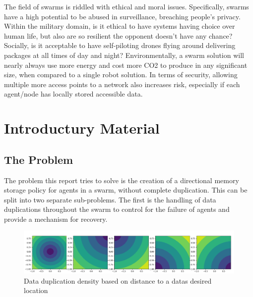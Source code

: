 \documentclass{UoYCSproject}
\begin{document}
\begin{summary}

The field of swarms is riddled with ethical and moral issues. Specifically, swarms have a high potential to be abused in surveillance, breaching people's privacy. Within the military domain, is it ethical to have systems having choice over human life, but also are so resilient the opponent doesn’t have any chance? Socially, is it acceptable to have self-piloting drones flying around delivering packages at all times of day and night? Environmentally, a swarm solution will nearly always use more energy and cost more CO2 to produce in any significant size, when compared to a single robot solution. In terms of security, allowing multiple more access points to a network also increases risk, especially if each agent/node has locally stored accessible data.

\end{summary}




\chapter{Introductury Material}
\label{cha:Introductury Material}

\section{The Problem}
\label{sec:Problem}

The problem this report tries to solve is the creation of a directional memory storage policy for agents in a swarm, without complete duplication.
This can be split into two separate sub-problems.
The first is the handling of data duplications throughout the swarm to control for the failure of agents and provide a mechanism for recovery.

\begin{figure}[htb]
\label{fig:popdensity}
\begin{center}
\centering
\includegraphics[width=\linewidth]{"./ExplanationImgs/Memory_Pop_Density.png"}
\caption{Data duplication density based on distance to a datas desired location}
\end{center}
\end{figure}
\end{document}
